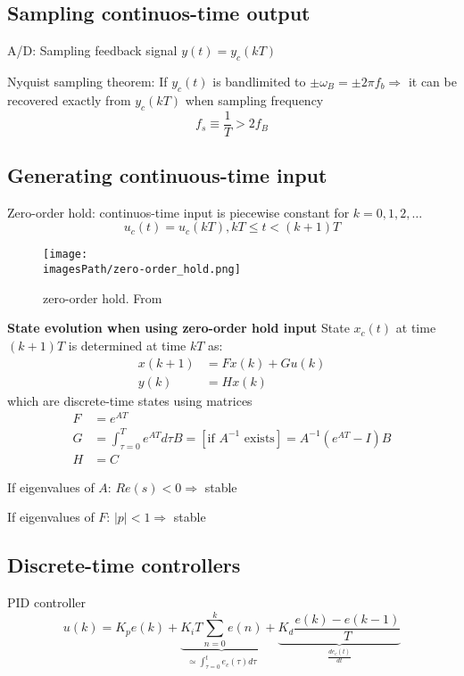 \subsection{Sampling continuos-time output}
A/D: Sampling feedback signal $y(t)=y_c(kT)$

Nyquist sampling theorem:
If $y_c(t)$ is bandlimited to $\pm\omega_B = \pm2\pi f_b \Rightarrow$
it can be recovered exactly from $y_c(kT)$ when sampling frequency
\begin{equation*}
    f_s \equiv \frac{1}{T} > 2f_B
\end{equation*}

\newpage
\subsection{Generating continuous-time input}
Zero-order hold: continuos-time input is piecewise constant for $k=0,1,2,\ldots$
\begin{equation*}
    u_c(t) = u_c(kT), kT\leq t < (k+1)T
\end{equation*}

\begin{figure}[!h]
    \centering
    \texttt{[image: \\imagesPath/zero-order\_hold.png]}
    \caption{zero-order hold. From \cite{}}
\end{figure}

\textbf{State evolution when using zero-order hold input} \newline
State $x_c(t)$ at time $(k+1)T$ is determined at time $kT$ as:
\begin{align*}
    x(k+1) &= Fx(k)+Gu(k) \\
    y(k) &= Hx(k)
\end{align*}
which are discrete-time states using matrices
\begin{align*}
    F &= e^{AT} \\
    G &= \int_{\tau=0}^{T} e^{AT} d\tau B = [\text{if } A^{-1} \text{ exists}] = A^{-1}(e^{AT}-I)B \\
    H &= C
\end{align*}

If eigenvalues of $A$: $Re(s) < 0 \Rightarrow$ stable

If eigenvalues of $F$: $|p|<1 \Rightarrow$ stable

\subsection{Discrete-time controllers}
PID controller 
\begin{equation*}
    u(k) = K_p e(k) + \underbrace{K_i T\sum_{n=0}^{k} e(n)}_{\simeq\int_{\tau=0}^te_c(\tau)d\tau} + \underbrace{K_d\frac{e(k)-e(k-1)}{T}}_{\frac{de_c(t)}{dt}}
\end{equation*}

